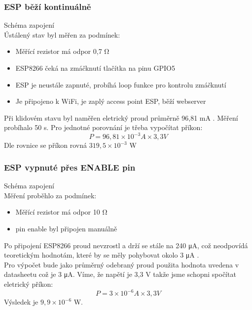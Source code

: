 \documentclass[a4paper, 12pt]{report}
\begin{document}
				\subsubsection{ESP běží kontinuálně}
					Schéma zapojení  \\
					Ústálený stav byl měřen za podmínek:
					\begin{itemize}
						\item Měřící rezistor má odpor 0,7 \si{\ohm}
						\item ESP8266 čeká na zmáčknutí tlačítka na pinu GPIO5
						\item ESP je neustále zapnuté, probíhá loop funkce pro kontrolu zmáčknutí
						\item Je připojeno k WiFi, je zaplý access point ESP, běží webserver
					\end{itemize}
		 			Při klidovém stavu byl naměřen eletrický proud průměrně 96,81 \si{mA} . Měření probíhalo 50 \si{s}. Pro jednotné porovnání je třeba vypočítat příkon:
						$$P = 96,81 \times 10^{-3}\si{A} \times 3,3 \si{ V}$$
		 			Dle rovnice se příkon rovná $ 319,5 \times 10^{-3}$ \si{\watt}\\

				\subsubsection{ESP vypnuté přes ENABLE pin}
					Schéma zapojení \\
					Měření proběhlo za podmínek:
					\begin{itemize}
						\item Měřící rezistor má odpor 10 \si{\ohm}
						\item pin enable byl připojen manuálně
					\end{itemize}
					Po připojení ESP8266 proud nevzrostl a drží se stále na 240 \si{\micro A}, což neodpovídá teoretickým hodnotám, které by se měly pohybovat okolo 3 \si{\micro A}
					.\\
					Pro výpočet bude jako průměrný odebraný proud použita hodnota uvedena v datasheetu což je 3 \si{\micro A}. Víme, že napětí je 3,3 \si{V} takže jsme schopni spočítat eletrický příkon:
				 		$$P = 3\times 10^{-6} \si{A}\times 3,3 \si{V}$$
					Výsledek je $9,9 \times 10^{-6}$ \si{\watt}.
\end{document}
